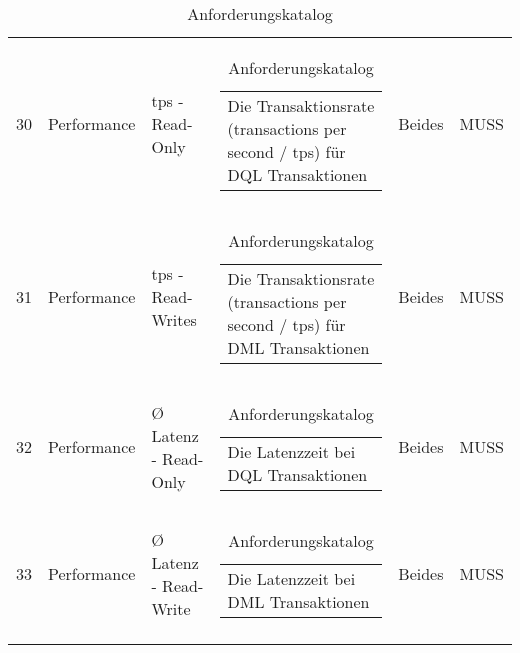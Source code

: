 \begin{longtable}[H]{rlllll}
30 & Performance & tps - Read-Only & \begin{tabular}[c]{@{}l@{}}Die Transaktionsrate (transactions per second / tps) für DQL Transaktionen\end{tabular} & Beides & MUSS \\
31 & Performance & tps - Read-Writes & \begin{tabular}[c]{@{}l@{}}Die Transaktionsrate (transactions per second / tps) für DML Transaktionen\end{tabular} & Beides & MUSS \\
32 & Performance & Ø Latenz - Read-Only & \begin{tabular}[c]{@{}l@{}}Die Latenzzeit bei DQL Transaktionen\end{tabular} & Beides & MUSS \\
33 & Performance & Ø Latenz - Read-Write & \begin{tabular}[c]{@{}l@{}}Die Latenzzeit bei DML Transaktionen\end{tabular} & Beides & MUSS \\
\caption{Anforderungskatalog} \label{anforderungskatalog}
\end{longtable}
